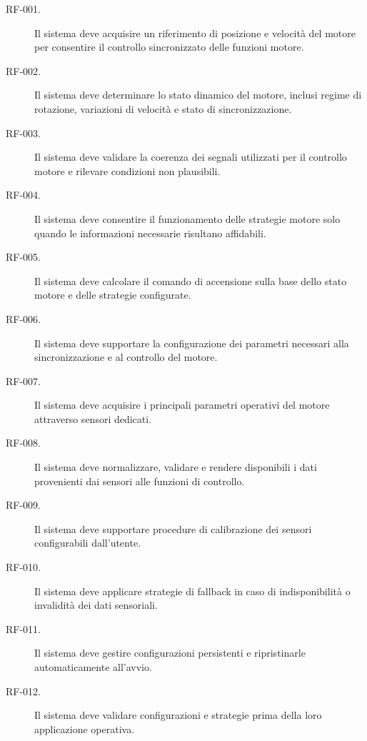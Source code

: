 \documentclass{article}
\begin{document}
\begin{description}
    \item[RF-001.] Il sistema deve acquisire un riferimento di posizione e
          velocità del motore per consentire il controllo sincronizzato delle
          funzioni motore.

    \item[RF-002.] Il sistema deve determinare lo stato dinamico del motore,
          inclusi regime di rotazione, variazioni di velocità e stato di
          sincronizzazione.

    \item[RF-003.] Il sistema deve validare la coerenza dei segnali utilizzati
          per il controllo motore e rilevare condizioni non plausibili.

    \item[RF-004.] Il sistema deve consentire il funzionamento delle strategie
          motore solo quando le informazioni necessarie risultano affidabili.

    \item[RF-005.] Il sistema deve calcolare il comando di accensione sulla base
          dello stato motore e delle strategie configurate.

    \item[RF-006.] Il sistema deve supportare la configurazione dei parametri
          necessari alla sincronizzazione e al controllo del motore.

    \item[RF-007.] Il sistema deve acquisire i principali parametri operativi
          del motore attraverso sensori dedicati.

    \item[RF-008.] Il sistema deve normalizzare, validare e rendere disponibili
          i dati provenienti dai sensori alle funzioni di controllo.

    \item[RF-009.] Il sistema deve supportare procedure di calibrazione dei
          sensori configurabili dall'utente.

    \item[RF-010.] Il sistema deve applicare strategie di fallback in caso di
          indisponibilità o invalidità dei dati sensoriali.

    \item[RF-011.] Il sistema deve gestire configurazioni persistenti e
          ripristinarle automaticamente all'avvio.

    \item[RF-012.] Il sistema deve validare configurazioni e strategie prima
          della loro applicazione operativa.


\end{description}
\end{document}
